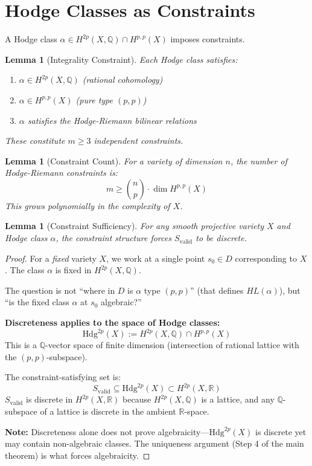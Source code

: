 \documentclass[12pt]{article}
\newtheorem{lemma}[theorem]{Lemma}
\begin{document}
\section{Hodge Classes as Constraints}

A Hodge class $\alpha \in H^{2p}(X, \mathbb{Q}) \cap H^{p,p}(X)$ imposes constraints.

\begin{lemma}[Integrality Constraint]
Each Hodge class satisfies:
\begin{enumerate}
\item $\alpha \in H^{2p}(X, \mathbb{Q})$ (rational cohomology)
\item $\alpha \in H^{p,p}(X)$ (pure type $(p,p)$)
\item $\alpha$ satisfies the Hodge-Riemann bilinear relations
\end{enumerate}
These constitute $m \geq 3$ independent constraints.
\end{lemma}

\begin{lemma}[Constraint Count]
For a variety of dimension $n$, the number of Hodge-Riemann constraints is:
\[
m \geq \binom{n}{p} \cdot \dim H^{p,p}(X)
\]
This grows polynomially in the complexity of $X$.
\end{lemma}

\begin{lemma}[Constraint Sufficiency]
For any smooth projective variety $X$ and Hodge class $\alpha$, 
the constraint structure forces $S_{\text{valid}}$ to be discrete.
\end{lemma}

\begin{proof}
For a \emph{fixed} variety $X$, we work at a single point $s_0 \in D$ 
corresponding to $X$. The class $\alpha$ is fixed in $H^{2p}(X,\mathbb{Q})$.

The question is not ``where in $D$ is $\alpha$ type $(p,p)$'' (that defines $HL(\alpha)$),
but ``is the fixed class $\alpha$ at $s_0$ algebraic?''

\textbf{Discreteness applies to the space of Hodge classes:}
\[
\text{Hdg}^{2p}(X) := H^{2p}(X,\mathbb{Q}) \cap H^{p,p}(X)
\]
This is a $\mathbb{Q}$-vector space of finite dimension (intersection of 
rational lattice with the $(p,p)$-subspace). 

The constraint-satisfying set is:
\[
S_{\text{valid}} \subseteq \text{Hdg}^{2p}(X) \subset H^{2p}(X,\mathbb{R})
\]
$S_{\text{valid}}$ is discrete in $H^{2p}(X,\mathbb{R})$ because $H^{2p}(X,\mathbb{Q})$ is 
a lattice, and any $\mathbb{Q}$-subspace of a lattice is discrete in the ambient $\mathbb{R}$-space.

\textbf{Note:} Discreteness alone does not prove algebraicity---$\text{Hdg}^{2p}(X)$ 
is discrete yet may contain non-algebraic classes. The uniqueness argument 
(Step 4 of the main theorem) is what forces algebraicity.
\end{proof}
\end{document}
